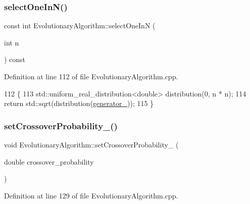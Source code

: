 \mbox{\label{classEvolutionaryAlgorithm_a8efaa380f6d1b9a2f8a6ad44e2d362e2}} 
\subsubsection{\texorpdfstring{select\+One\+In\+N()}{selectOneInN()}}
{\footnotesize\ttfamily const int Evolutionary\+Algorithm\+::select\+One\+InN (\begin{DoxyParamCaption}\item[{int}]{n }\end{DoxyParamCaption}) const\hspace{0.3cm}{\ttfamily [private]}}



Definition at line 112 of file Evolutionary\+Algorithm.\+cpp.


\begin{DoxyCode}
112                                                          \{
113     std::uniform\_real\_distribution<double> distribution(0, n * n);
114     \textcolor{keywordflow}{return} std::sqrt(distribution(\hyperlink{classEvolutionaryAlgorithm_adbd823d385ad95bf20496fd2fc25ccde}{generator\_}));
115 \}
\end{DoxyCode}
\mbox{\label{classEvolutionaryAlgorithm_ab5951bdd3eec16074aff63349726dee8}} 
\subsubsection{\texorpdfstring{set\+Crossover\+Probability\+\_\+()}{setCrossoverProbability\_()}}
{\footnotesize\ttfamily void Evolutionary\+Algorithm\+::set\+Crossover\+Probability\+\_\+ (\begin{DoxyParamCaption}\item[{double}]{crossover\+\_\+probability }\end{DoxyParamCaption})}



Definition at line 129 of file Evolutionary\+Algorithm.\+cpp.


